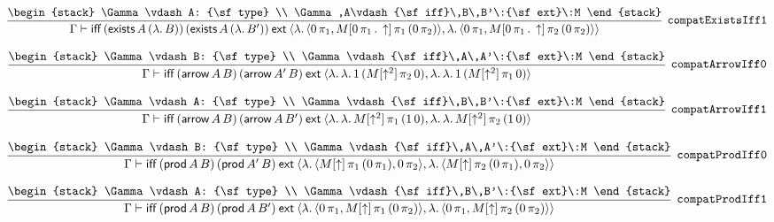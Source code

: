 \[
\infer[{\tt compatExistsIff1}]{\Gamma \vdash {\sf iff}\,({\sf exists}\,A\,(\lambda .\,B))\,({\sf exists}\,A\,(\lambda .\,B'))\:{\sf ext}\:\langle \lambda .\,\langle 0\, \pi_1,M[0\, \pi_1\,.\,\uparrow ]\, \pi_1\,(0\, \pi_2)\rangle ,\lambda .\,\langle 0\, \pi_1,M[0\, \pi_1\,.\,\uparrow ]\, \pi_2\,(0\, \pi_2)\rangle \rangle }{
\begin{stack}
\Gamma \vdash A: {\sf type}
\\
\Gamma ,A\vdash {\sf iff}\,B\,B'\:{\sf ext}\:M
\end{stack}}
\]

\[
\infer[{\tt compatArrowIff0}]{\Gamma \vdash {\sf iff}\,({\sf arrow}\,A\,B)\,({\sf arrow}\,A'\,B)\:{\sf ext}\:\langle \lambda .\,\lambda .\,1\,(M[\uparrow^2]\, \pi_2\,0),\lambda .\,\lambda .\,1\,(M[\uparrow^2]\, \pi_1\,0)\rangle }{
\begin{stack}
\Gamma \vdash B: {\sf type}
\\
\Gamma \vdash {\sf iff}\,A\,A'\:{\sf ext}\:M
\end{stack}}
\]

\[
\infer[{\tt compatArrowIff1}]{\Gamma \vdash {\sf iff}\,({\sf arrow}\,A\,B)\,({\sf arrow}\,A\,B')\:{\sf ext}\:\langle \lambda .\,\lambda .\,M[\uparrow^2]\, \pi_1\,(1\,0),\lambda .\,\lambda .\,M[\uparrow^2]\, \pi_2\,(1\,0)\rangle }{
\begin{stack}
\Gamma \vdash A: {\sf type}
\\
\Gamma \vdash {\sf iff}\,B\,B'\:{\sf ext}\:M
\end{stack}}
\]

\[
\infer[{\tt compatProdIff0}]{\Gamma \vdash {\sf iff}\,({\sf prod}\,A\,B)\,({\sf prod}\,A'\,B)\:{\sf ext}\:\langle \lambda .\,\langle M[\uparrow ]\, \pi_1\,(0\, \pi_1),0\, \pi_2\rangle ,\lambda .\,\langle M[\uparrow ]\, \pi_2\,(0\, \pi_1),0\, \pi_2\rangle \rangle }{
\begin{stack}
\Gamma \vdash B: {\sf type}
\\
\Gamma \vdash {\sf iff}\,A\,A'\:{\sf ext}\:M
\end{stack}}
\]

\[
\infer[{\tt compatProdIff1}]{\Gamma \vdash {\sf iff}\,({\sf prod}\,A\,B)\,({\sf prod}\,A\,B')\:{\sf ext}\:\langle \lambda .\,\langle 0\, \pi_1,M[\uparrow ]\, \pi_1\,(0\, \pi_2)\rangle ,\lambda .\,\langle 0\, \pi_1,M[\uparrow ]\, \pi_2\,(0\, \pi_2)\rangle \rangle }{
\begin{stack}
\Gamma \vdash A: {\sf type}
\\
\Gamma \vdash {\sf iff}\,B\,B'\:{\sf ext}\:M
\end{stack}}
\]

